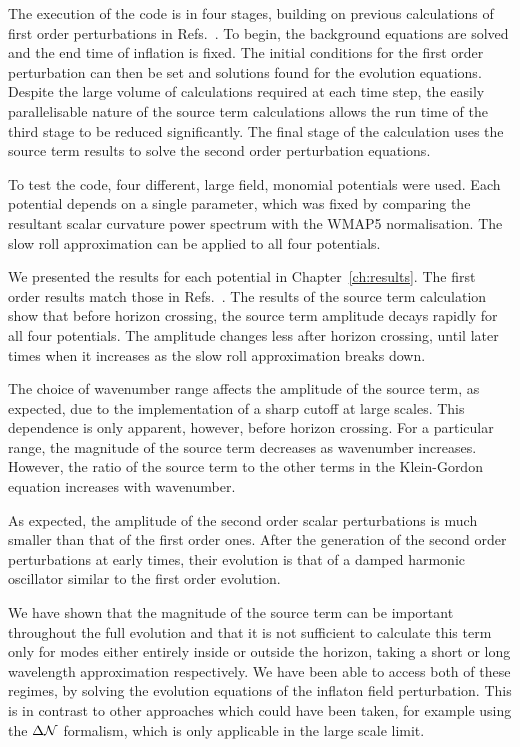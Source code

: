 The execution of the code is in four stages, building on previous calculations of
first order perturbations in Refs.~\cite{Martin:2006rs, Ringeval:2007am,
Salopek:1988qh}. To begin, the background equations are solved and the end time of
inflation is fixed. The initial conditions for the first order perturbation can then
be set and solutions found for the evolution equations.
Despite the large volume of calculations required at each
time step, the easily parallelisable nature of the source term calculations allows
the run time of the third stage to be reduced significantly. 
The final stage of the calculation uses the source term results to solve the second
order perturbation equations.


To test the code, four different, large field, monomial potentials were used. Each
potential depends on a single parameter, which was fixed by comparing the resultant scalar
curvature power spectrum with the WMAP5 normalisation. The slow roll
approximation can be applied to all four potentials.

We presented the results for each potential in Chapter~\ref{ch:results}. The first
order results match those in Refs.~\cite{Martin:2006rs, Ringeval:2007am, Salopek:1988qh}. The
results of the source term calculation show that before
horizon crossing, the source term amplitude decays rapidly for all four potentials.
The amplitude changes less after horizon crossing, until later times when it increases
as the slow roll approximation breaks down.

The choice of wavenumber range affects the amplitude of the source term, as
expected, due to the implementation of a sharp cutoff at large scales. This
dependence is only apparent, however, before horizon crossing. For a particular
range,  the magnitude of the source term decreases as wavenumber increases. However,
the ratio of the source term to the other terms in the Klein-Gordon equation increases with
wavenumber. 

As expected, the amplitude of the second order scalar perturbations is much smaller
than that of the first order ones. After the generation of the second order
perturbations at early times, their evolution is that of a damped harmonic
oscillator similar to the first order evolution.

We have shown that the magnitude of the source term can be important throughout the
full evolution and that it is not sufficient to calculate this term only for
modes either entirely inside or outside the horizon, \iec taking a short or long
wavelength approximation respectively. We have been able to access both of these
regimes, by solving the evolution equations of the
inflaton field perturbation. This is in contrast to other approaches which could
have been taken, for example using the $\Delta\mathcal{N}$
formalism, which is only applicable in the large scale limit.


